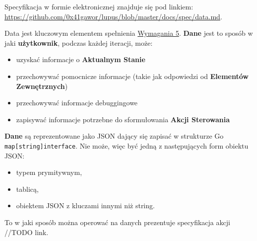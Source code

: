 \label{appendix:5}

Specyfikacja w formie elektronicznej znajduje się pod linkiem: \url{https://github.com/0x41gawor/lupus/blob/master/docs/spec/data.md}.

Data jest kluczowym elementem spełnienia \hyperref[req:5]{Wymagania 5}. \textbf{Dane} jest to sposób w jaki \textbf{użytkownik}, podczas każdej iteracji, może:
\begin{itemize}
    \item uzyskać informacje o \textbf{Aktualnym Stanie}
    \item przechowywać pomocnicze informacje (takie jak odpowiedzi od \textbf{Elementów Zewnętrznych})
    \item przechowywać informacje debuggingowe
    \item zapisywać informacje potrzebne do sformułowania \textbf{Akcji Sterowania}
\end{itemize}

\textbf{Dane} są reprezentowane jako JSON dający się zapisać w strukturze Go \texttt{map[string]interface{}}. Nie może, więc być jedną z następujących form obiektu JSON:
\begin{itemize}
    \item typem prymitywnym,
    \item tablicą,
    \item obiektem JSON z kluczami innymi niż string.
\end{itemize}

To w jaki sposób można operować na danych prezentuje specyfikacja akcji //TODO link.